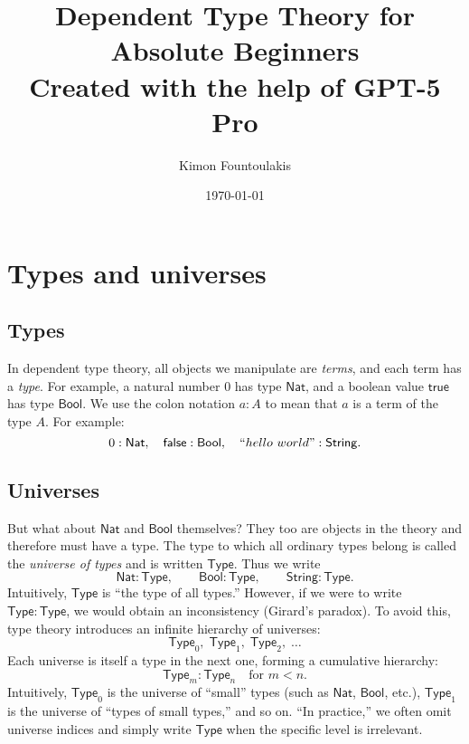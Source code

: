 \documentclass{article}
\title{Dependent Type Theory for Absolute Beginners \\\vspace{0.2cm} 
\small Created with the help of GPT-5 Pro}
\author{Kimon Fountoulakis}
\date{\today}
\newcommand{\Type}{\ensuremath{\mathsf{Type}}}
\newcommand{\Nat}{\mathsf{Nat}}
\newcommand{\Bool}{\mathsf{Bool}}
\newcommand{\String}{\mathsf{String}}
\begin{document}
\maketitle

\section{Types and universes}

\subsection*{Types}

In dependent type theory, all objects we manipulate are \emph{terms}, and each term has a \emph{type}.  
For example, a natural number \(0\) has type \(\Nat\), and a boolean value \(\mathsf{true}\) has type \(\Bool\). We use the colon notation \(a : A\) to mean that \(a\) is a term of the type \(A\).  
For example:
\[
0 : \Nat, \quad \mathsf{false} : \Bool, \quad ``hello \ world" : \String.
\]





\subsection*{Universes}

But what about \(\Nat\) and \(\Bool\) themselves?  
They too are objects in the theory and therefore must have a type.  
The type to which all ordinary types belong is called the \emph{universe of types} and is written \(\Type\).  
Thus we write
\[
\Nat : \Type, \qquad \Bool : \Type, \qquad \String : \Type.
\]
Intuitively, \(\Type\) is “the type of all types.”  
However, if we were to write \(\Type : \Type\), we would obtain an inconsistency (Girard’s paradox).  
To avoid this, type theory introduces an infinite hierarchy of universes:
\[
\Type_0,\;\Type_1,\;\Type_2,\;\dots
\]
Each universe is itself a type in the next one, forming a cumulative hierarchy:
\[
\Type_m : \Type_n \quad \text{for } m < n.
\]
Intuitively, $\Type_0$ is the universe of ``small'' types (such as $\Nat$, $\Bool$, etc.), $\Type_1$ is the universe of ``types of small types,'' and so on. ``In practice,'' we often omit universe indices and simply write $\Type$
when the specific level is irrelevant.
\end{document}
